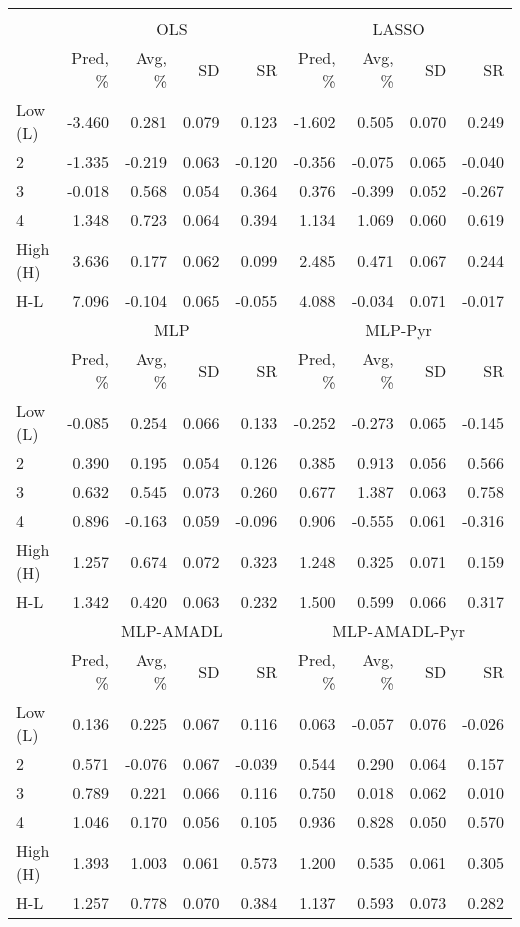 \begin{tabular}{lrrrrrrrr}
\hline \hline \\ [-1.8ex]
 & \multicolumn{4}{c}{OLS} & \multicolumn{4}{c}{LASSO} \\
 \cmidrule(lr){2-5} \cmidrule(lr){6-9}
  & Pred, \% & Avg, \% & SD & SR & Pred, \% & Avg, \% & SD & SR \\
\midrule
Low (L) & -3.460 & 0.281 & 0.079 & 0.123 & -1.602 & 0.505 & 0.070 & 0.249 \\
2 & -1.335 & -0.219 & 0.063 & -0.120 & -0.356 & -0.075 & 0.065 & -0.040 \\
3 & -0.018 & 0.568 & 0.054 & 0.364 & 0.376 & -0.399 & 0.052 & -0.267 \\
4 & 1.348 & 0.723 & 0.064 & 0.394 & 1.134 & 1.069 & 0.060 & 0.619 \\
High (H) & 3.636 & 0.177 & 0.062 & 0.099 & 2.485 & 0.471 & 0.067 & 0.244 \\
H-L & 7.096 & -0.104 & 0.065 & -0.055 & 4.088 & -0.034 & 0.071 & -0.017 \\
\midrule
 & \multicolumn{4}{c}{MLP} & \multicolumn{4}{c}{MLP-Pyr} \\
 \cmidrule(lr){2-5} \cmidrule(lr){6-9}
  & Pred, \% & Avg, \% & SD & SR & Pred, \% & Avg, \% & SD & SR \\
\midrule
Low (L) & -0.085 & 0.254 & 0.066 & 0.133 & -0.252 & -0.273 & 0.065 & -0.145 \\
2 & 0.390 & 0.195 & 0.054 & 0.126 & 0.385 & 0.913 & 0.056 & 0.566 \\
3 & 0.632 & 0.545 & 0.073 & 0.260 & 0.677 & 1.387 & 0.063 & 0.758 \\
4 & 0.896 & -0.163 & 0.059 & -0.096 & 0.906 & -0.555 & 0.061 & -0.316 \\
High (H) & 1.257 & 0.674 & 0.072 & 0.323 & 1.248 & 0.325 & 0.071 & 0.159 \\
H-L & 1.342 & 0.420 & 0.063 & 0.232 & 1.500 & 0.599 & 0.066 & 0.317 \\
\midrule
 & \multicolumn{4}{c}{MLP-AMADL} & \multicolumn{4}{c}{MLP-AMADL-Pyr} \\
 \cmidrule(lr){2-5} \cmidrule(lr){6-9}
  & Pred, \% & Avg, \% & SD & SR & Pred, \% & Avg, \% & SD & SR \\
\midrule
Low (L) & 0.136 & 0.225 & 0.067 & 0.116 & 0.063 & -0.057 & 0.076 & -0.026 \\
2 & 0.571 & -0.076 & 0.067 & -0.039 & 0.544 & 0.290 & 0.064 & 0.157 \\
3 & 0.789 & 0.221 & 0.066 & 0.116 & 0.750 & 0.018 & 0.062 & 0.010 \\
4 & 1.046 & 0.170 & 0.056 & 0.105 & 0.936 & 0.828 & 0.050 & 0.570 \\
High (H) & 1.393 & 1.003 & 0.061 & 0.573 & 1.200 & 0.535 & 0.061 & 0.305 \\
H-L & 1.257 & 0.778 & 0.070 & 0.384 & 1.137 & 0.593 & 0.073 & 0.282 \\
\hline \hline
\end{tabular}